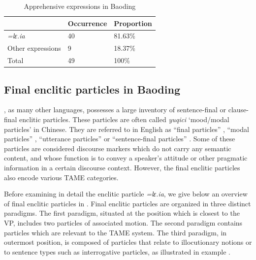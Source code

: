 \documentclass[output=paper,colorlinks,citecolor=brown, language=chinese]{langscibook}
\begin{document}
\begin{table}
\begin{tabularx}{.8\textwidth}{lYY}
\lsptoprule
 &  {Occurrence} &  {Proportion} \\
\midrule
\textit{=lɛ.ia}         & 40        & 81.63\%   \\
Other expressions       & 9         & 18.37\%   \\
\midrule
Total                   & 49        & 100\%     \\
\midrule
\end{tabularx}
\caption{Apprehensive expressions in Baoding}
\label{tab:song:1}
\end{table}


\subsection{Final enclitic particles in Baoding}
\label{subsec:finalparticle}

, as many other  languages, possesses a large inventory of sentence-final or clause-final enclitic particles. These particles are often called \textit{yuqici} `mood/modal particles' in Chinese. They are referred to in English as ``final particles'' \citep[149]{Chao1968}, ``modal particles'' \citep{Chappell1991}, ``utterance particles'' \citep{Luke1990} or ``sentence-final particles'' \citep[238]{LiThompson1981}. Some of these particles are considered discourse markers which do not carry any semantic content, and whose function is to convey a speaker's attitude or other pragmatic information in a certain discourse context. However, the  final enclitic particles also encode various TAME categories. 

Before examining in detail the enclitic particle \textit{=lɛ.ia}, we give below an overview of final enclitic particles in  \citep{song2020}. Final enclitic particles are organized in three distinct paradigms. The first paradigm, situated at the position which is closest to the VP, includes two particles of associated motion. The second paradigm contains particles which are relevant to the TAME system. The third paradigm, in outermost position, is composed of particles that relate to illocutionary notions or to sentence types such as interrogative particles, as illustrated in  example .
\end{document}
